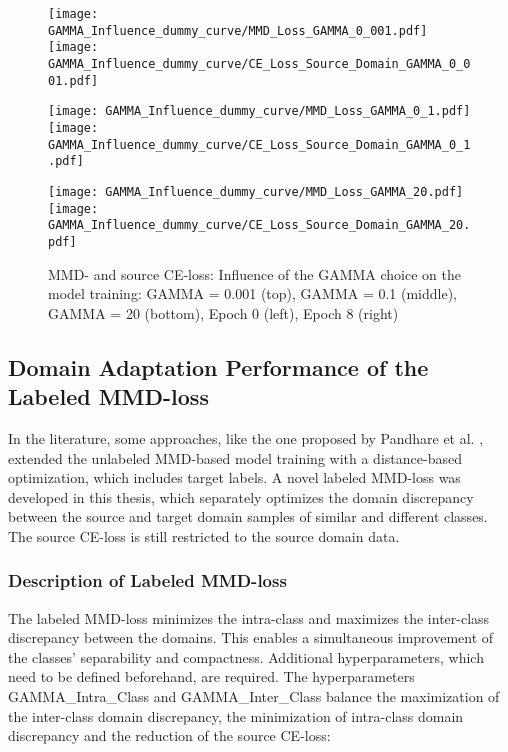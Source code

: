 \begin{figure}[H]
  \centering
  \texttt{[image: GAMMA\_Influence\_dummy\_curve/MMD\_Loss\_GAMMA\_0\_001.pdf]}
  \hspace{.3cm}
  \texttt{[image: GAMMA\_Influence\_dummy\_curve/CE\_Loss\_Source\_Domain\_GAMMA\_0\_001.pdf]}

  \vspace{.1cm}

  \texttt{[image: GAMMA\_Influence\_dummy\_curve/MMD\_Loss\_GAMMA\_0\_1.pdf]}
  \hspace{.3cm}
  \texttt{[image: GAMMA\_Influence\_dummy\_curve/CE\_Loss\_Source\_Domain\_GAMMA\_0\_1.pdf]}

  \vspace{.1cm}

  \texttt{[image: GAMMA\_Influence\_dummy\_curve/MMD\_Loss\_GAMMA\_20.pdf]}
  \hspace{.1cm}
  \texttt{[image: GAMMA\_Influence\_dummy\_curve/CE\_Loss\_Source\_Domain\_GAMMA\_20.pdf]}

  \caption{MMD- and source CE-loss: Influence of the GAMMA choice on the model training: GAMMA = 0.001 (top), GAMMA = 0.1 (middle), GAMMA = 20 (bottom), Epoch 0 (left), Epoch 8 (right)}
  \label{fig:learning_curves_influence_mmd_feature_extractor}
\end{figure}

\subsection{Domain Adaptation Performance of the Labeled MMD-loss} \label{sec:Differences of labeled and unlabeled MMD loss}

In the literature, some approaches, like the one proposed by Pandhare et al. \cite{Pandhare2021}, extended the unlabeled MMD-based model training with a distance-based optimization, which includes target labels. A novel labeled MMD-loss was developed in this thesis, which separately optimizes the domain discrepancy between the source and target domain samples of similar and different classes. The source CE-loss is still restricted to the source domain data.
\subsubsection{Description of Labeled MMD-loss}
The labeled MMD-loss minimizes the intra-class and maximizes the inter-class discrepancy between the domains. This enables a simultaneous improvement of the classes' separability and compactness. Additional hyperparameters, which need to be defined beforehand, are required. The hyperparameters GAMMA\_Intra\_Class and GAMMA\_Inter\_Class balance the maximization of the inter-class domain discrepancy, the minimization of intra-class domain discrepancy and the reduction of the source CE-loss:

